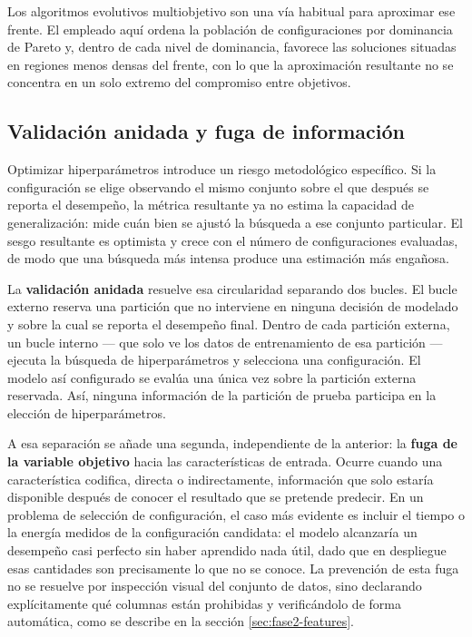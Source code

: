 \documentclass[12pt,oneside,spanish]{book}
\begin{document}
Los algoritmos evolutivos multiobjetivo son una vía habitual para aproximar ese frente. El empleado aquí ordena la población de configuraciones por dominancia de Pareto y, dentro de cada nivel de dominancia, favorece las soluciones situadas en regiones menos densas del frente, con lo que la aproximación resultante no se concentra en un solo extremo del compromiso entre objetivos.

\subsection{Validación anidada y fuga de información}
\label{sec:marco-validacion-anidada}

Optimizar hiperparámetros introduce un riesgo metodológico específico. Si la configuración se elige observando el mismo conjunto sobre el que después se reporta el desempeño, la métrica resultante ya no estima la capacidad de generalización: mide cuán bien se ajustó la búsqueda a ese conjunto particular. El sesgo resultante es optimista y crece con el número de configuraciones evaluadas, de modo que una búsqueda más intensa produce una estimación más engañosa.

La \textbf{validación anidada} resuelve esa circularidad separando dos bucles. El bucle externo reserva una partición que no interviene en ninguna decisión de modelado y sobre la cual se reporta el desempeño final. Dentro de cada partición externa, un bucle interno --- que solo ve los datos de entrenamiento de esa partición --- ejecuta la búsqueda de hiperparámetros y selecciona una configuración. El modelo así configurado se evalúa una única vez sobre la partición externa reservada. Así, ninguna información de la partición de prueba participa en la elección de hiperparámetros.

A esa separación se añade una segunda, independiente de la anterior: la \textbf{fuga de la variable objetivo} hacia las características de entrada. Ocurre cuando una característica codifica, directa o indirectamente, información que solo estaría disponible después de conocer el resultado que se pretende predecir. En un problema de selección de configuración, el caso más evidente es incluir el tiempo o la energía medidos de la configuración candidata: el modelo alcanzaría un desempeño casi perfecto sin haber aprendido nada útil, dado que en despliegue esas cantidades son precisamente lo que no se conoce. La prevención de esta fuga no se resuelve por inspección visual del conjunto de datos, sino declarando explícitamente qué columnas están prohibidas y verificándolo de forma automática, como se describe en la sección \ref{sec:fase2-features}.
\end{document}
